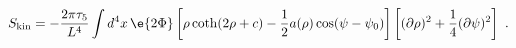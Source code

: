 \begin{equation}
\label{Skin}
  S_{\mathrm{kin}} = - \frac{2\pi\tau_5}{L^4} \int d^4x\, \e{2\Phi} 
  \left[\rho \coth(2\rho+c) -\frac12 a(\rho) \cos(\psi-\psi_0) \right] 
  \left[ (\partial \rho)^2 +\frac14 (\partial \psi)^2 \right]~.
\end{equation}

